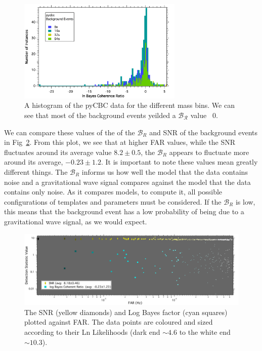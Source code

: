 \documentclass{article}
\begin{document}
     \begin{figure}[h!]
     	\centering
     	\includegraphics[width=0.7\textwidth]{Figures/lnBCRhistogram.png} 
     	\caption{A histogram of the pyCBC data for the different mass bins. We can see that most of the background events yeilded a $\mathcal{B_R}$ value ~0.}
     	\label{Fig:histogramBCR}
     \end{figure}
     
     
  
  We can compare these values of the of the $\mathcal{B}_{R}$ and SNR of the background events in Fig~\ref{Fig:BcrVSFAR}. From this plot, we see that at higher FAR values, while the SNR fluctuates around its average value $8.2\pm0.5$, the $\mathcal{B}_{R}$ appears to fluctuate more around its average, $-0.23\pm1.2$. It is important to note these values mean greatly different things. The $\mathcal{B}_{R}$ informs us how well the model that the data contains noise and a gravitational wave signal compares against the model that the data contains only noise. As it compares models, to compute it, all possible configurations of templates and parameters must be considered. If the $\mathcal{B}_{R}$ is low, this means that the background event has a low probability of being due to a gravitational wave signal, as we would expect.\\
 
  \begin{figure}[h!]
  	\centering
  	\includegraphics[width=1\textwidth]{Figures/detectionStatVSfar8s.pdf} 
  	\caption{The SNR (yellow diamonds) and Log Bayes factor (cyan squares) plotted against FAR. The data points are coloured and sized according to their Ln Likelihoods (dark end $\sim4.6$ to the white end $\sim10.3$). }
  	\label{Fig:BcrVSFAR}
  \end{figure}
  
\end{document}
